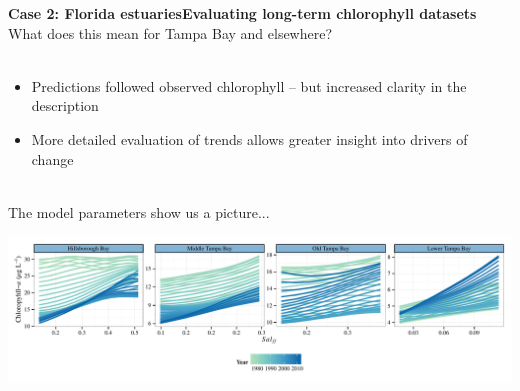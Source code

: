 \documentclass[serif]{beamer}\usepackage[]{graphicx}\usepackage[]{color}
\begin{document}
\begin{frame}{\textbf{Case 2: Florida estuaries}}{\textbf{Evaluating long-term chlorophyll datasets}}
\onslide<+->
What does this mean for Tampa Bay and elsewhere?\\~\\
\begin{itemize}
\item Predictions followed observed chlorophyll -- but increased clarity in the description
\item More detailed evaluation of trends allows greater insight into drivers of change\\~\\
\end{itemize}
\onslide<+->
The model parameters show us a picture...
\centerline{\includegraphics[width = \textwidth]{fig/title_plo.pdf}}
\end{frame}
\end{document}
